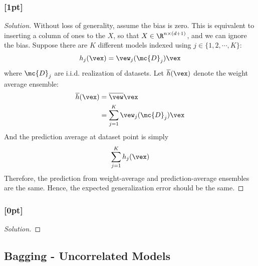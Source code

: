 \documentclass{article}
\begin{document}
	\subsubsection{[1pt]}
	\begin{proof}[Solution]
		Without loss of generality, assume the bias is zero. This is equivalent to inserting a column of ones to the $X$, so that $X \in \R^{n \times (d+1)}$, and we can ignore the bias. Suppose there are $K$ different models indexed using $j \in \{1, 2, \cdots, K\}$:
		\begin{align}
			h_j(\vex) = \vew_j(\mc{D}_j)\vex
		\end{align}
		where $\mc{D}_j$ are i.i.d. realization of datasets. Let $\overline{h}(\vex)$ denote the weight average ensemble:
		\begin{align}
			\overline{h}(\vex) &= \overline{\vew} \vex\\
			&= \sum_{j=1}^K \vew_j(\mc{D}_j)\vex
		\end{align}
		And the prediction average at dataset point \vex is simply
		\begin{align}
			\sum_{j=1}^K h_j(\vex)
		\end{align}
		Therefore, the prediction from weight-average and prediction-average ensembles are the same. Hence, the expected generalization error should be the same.
	\end{proof}
	
	\subsubsection{[0pt]}
	\begin{proof}[Solution]
		
	\end{proof}
	
	\subsection{Bagging - Uncorrelated Models}
\end{document}
